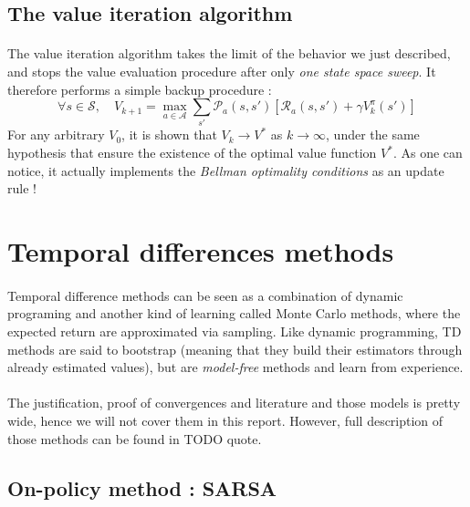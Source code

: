 \documentclass[a4paper]{report}
\begin{document}
{{			\subsection{The value iteration algorithm}
			{
				\paragraph{} The value iteration algorithm takes the limit of the behavior we just described, and stops the value evaluation procedure after only \emph{one state space sweep}. It therefore performs a simple backup procedure : 
					\begin{equation}
						\forall{s}\in\mathcal{S}, \quad V_{k+1}  = \max_{a\in\mathcal{A}}  \sum_{s'}\mathcal{P}_a(s,s')\left[\mathcal{R}_a(s,s') + \gamma V_k^\pi(s')\right]
					\end{equation}
					For any arbitrary $V_0$, it is shown that $V_k\to V^*$ as $k\to\infty$, under the same hypothesis that ensure the existence of the optimal value function $V^*$. As one can notice, it actually implements the \emph{Bellman optimality conditions} as an update rule !
				}
			}
		
		
		\section{Temporal differences methods}
		{
			\paragraph{} Temporal difference methods can be seen as a combination of dynamic programing and another kind of learning called Monte Carlo methods, where the expected return are approximated via sampling. Like dynamic programming, TD methods are said to bootstrap (meaning that they build their estimators through already estimated values), but are \emph{model-free} methods and learn from experience. 
			
			\paragraph{} The justification, proof of convergences and literature and those models is pretty wide, hence we will not cover them in this report. However, full description of those methods can be found in TODO quote. 
			
			\subsection{On-policy method : SARSA}
			{
}}}
\end{document}

